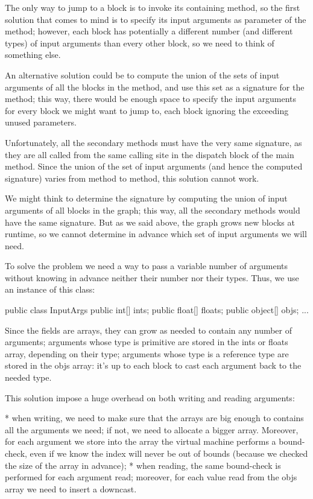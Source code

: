 {The only way to jump to a block is to invoke its containing method, so the first solution that comes to mind is to specify its input arguments as parameter of the method; however, each block has potentially a different number (and different types) of input arguments than every other block, so we need to think of something else.

An alternative solution could be to compute the union of the sets of input arguments of all the blocks in the method, and use this set as a signature for the method; this way, there would be enough space to specify the input arguments for every block we might want to jump to, each block ignoring the exceeding unused parameters.

Unfortunately, all the secondary methods must have the very same signature, as they are all called from the same calling site in the dispatch block of the main method. Since the union of the set of input arguments (and hence the computed signature) varies from method to method, this solution cannot work.

We might think to determine the signature by computing the union of input arguments of all blocks in the graph; this way, all the secondary methods would have the same signature. But as we said above, the graph grows new blocks at runtime, so we cannot determine in advance which set of input arguments we will need.

To solve the problem we need a way to pass a variable number of arguments without knowing in advance neither their number nor their types. Thus, we use an instance of this class:

public class InputArgs {
public int[] ints;
public float[] floats;
public object[] objs;
...
}

Since the fields are arrays, they can grow as needed to contain any number of arguments; arguments whose type is primitive are stored in the ints or floats array, depending on their type; arguments whose type is a reference type are stored in the objs array: it's up to each block to cast each argument back to the needed type.

This solution impose a huge overhead on both writing and reading arguments:

        * when writing, we need to make sure that the arrays are big enough to contains all the arguments we need; if not, we need to allocate a bigger array. Moreover, for each argument we store into the array the virtual machine performs a bound-check, even if we know the index will never be out of bounds (because we checked the size of the array in advance);
        * when reading, the same bound-check is performed for each argument read; moreover, for each value read from the objs array we need to insert a downcast.

}
